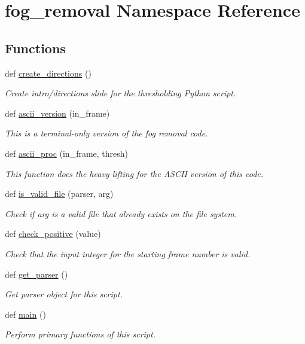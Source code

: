 \hypertarget{namespacefog__removal}{}\section{fog\+\_\+removal Namespace Reference}
\label{namespacefog__removal}
\subsection*{Functions}
\begin{DoxyCompactItemize}
\item 
def \hyperlink{namespacefog__removal_acc10907c635ab765dcf02a6fc6499620}{create\+\_\+directions} ()
\begin{DoxyCompactList}\small\item\em Create intro/directions slide for the thresholding Python script. \end{DoxyCompactList}\item 
def \hyperlink{namespacefog__removal_a6e25df53e59d9d8848b5e2ed5a399ea3}{ascii\+\_\+version} (in\+\_\+frame)
\begin{DoxyCompactList}\small\item\em This is a terminal-\/only version of the fog removal code. \end{DoxyCompactList}\item 
def \hyperlink{namespacefog__removal_a50fdb2a1e3f55a7f77230a689a372876}{ascii\+\_\+proc} (in\+\_\+frame, thresh)
\begin{DoxyCompactList}\small\item\em This function does the heavy lifting for the A\+S\+C\+II version of this code. \end{DoxyCompactList}\item 
def \hyperlink{namespacefog__removal_a7b07384f6a6ff8498e14f3aa5f8e2252}{is\+\_\+valid\+\_\+file} (parser, arg)
\begin{DoxyCompactList}\small\item\em Check if arg is a valid file that already exists on the file system. \end{DoxyCompactList}\item 
def \hyperlink{namespacefog__removal_a7ea01fc3bbbb26aa0f4d20724849308c}{check\+\_\+positive} (value)
\begin{DoxyCompactList}\small\item\em Check that the input integer for the starting frame number is valid. \end{DoxyCompactList}\item 
def \hyperlink{namespacefog__removal_a89c98f8f9a6d048485938fc05675ce9e}{get\+\_\+parser} ()
\begin{DoxyCompactList}\small\item\em Get parser object for this script. \end{DoxyCompactList}\item 
def \hyperlink{namespacefog__removal_a427a577da8405e5624962d7ef722aadf}{main} ()
\begin{DoxyCompactList}\small\item\em Perform primary functions of this script. \end{DoxyCompactList}\end{DoxyCompactItemize}
